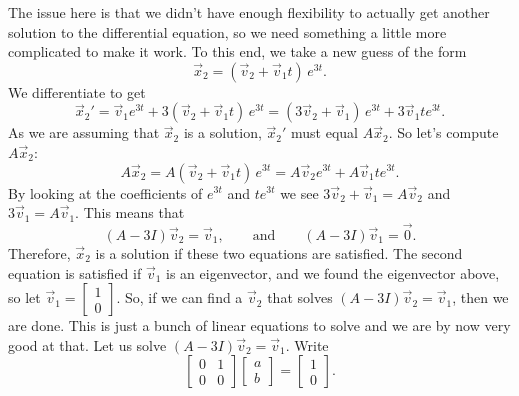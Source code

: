 \begin{example}
The issue here is that we didn't have enough flexibility to actually get another solution to the differential equation, so we need something a little more complicated to make it work. To this end, we take a new guess of the form
\begin{equation*}
\vec{x}_2 = ( \vec{v}_2 +  \vec{v}_1 t )\, e^{3t} .
\end{equation*}
We differentiate to get
\begin{equation*}
{\vec{x}_2}' =
\vec{v}_1 e^{3t} +
3 ( \vec{v}_2 +  \vec{v}_1 t )\, e^{3t}
=
( 3 \vec{v}_2 + \vec{v}_1 )\, e^{3t} +  3 \vec{v}_1 t e^{3t} .
\end{equation*}
As we are assuming that $\vec{x}_2$ is a solution, ${\vec{x}_2}'$ must
equal $A \vec{x}_2$. So let's compute $A \vec{x}_2$:
\begin{equation*}
A \vec{x}_2 = 
A ( \vec{v}_2 +  \vec{v}_1 t )\, e^{3t}
=
A \vec{v}_2 e^{3t} +  A \vec{v}_1 t e^{3t} .
\end{equation*}
By looking at the coefficients of $e^{3t}$ and $t e^{3t}$ we see
$3 \vec{v}_2 + \vec{v}_1 = A \vec{v}_2$ and
$3 \vec{v}_1 = A \vec{v}_1$.
This means that
\begin{equation*}
(A-3I)\vec{v}_2 = \vec{v}_1,
\qquad \text{and} \qquad
(A-3I)\vec{v}_1 = \vec{0}.
\end{equation*}
Therefore, $\vec{x}_2$ is a solution
if these two equations are satisfied.
The second equation is satisfied if $\vec{v}_1$ is an
eigenvector, and we found the eigenvector above, so let
$\vec{v}_1 = 
\left[ \begin{smallmatrix} 1 \\ 0 \end{smallmatrix} \right]$.
So, if we can find a $\vec{v}_2$ that solves
$(A-3I)\vec{v}_2 = \vec{v}_1$, then we are done.
This is just a bunch of linear
equations to solve and we are by now very good at that.
%
Let us solve
$(A-3I)\vec{v}_2 = \vec{v}_1$.  Write
\begin{equation*}
\begin{bmatrix}
0 & 1 \\ 0 & 0
\end{bmatrix}
\begin{bmatrix}
a \\ b
\end{bmatrix}
=
\begin{bmatrix}
1 \\ 0
\end{bmatrix} .
\end{equation*}

\end{example}
